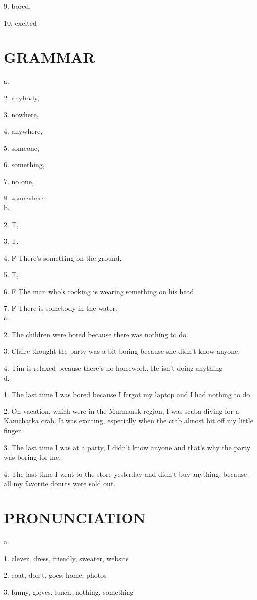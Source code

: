 \documentclass{article}
\begin{document}
9. bored, 

10. excited
\section*{GRAMMAR}


a. 

2. anybody, 

3. nowhere, 

4. anywhere, 

5. someone, 

6. something, 

7. no one, 

8. somewhere
\\
b. 

2. T, 

3. T,


4. F There's something on the ground.


5. T,


6. F The man who's cooking is wearing something on his head


7. F There is somebody in the water. 
\\
c. 

2. The children were bored because there was nothing to do.


3. Claire thought the party was a bit boring because she didn't know anyone.


4. Tim is relaxed because there's no homework. He isn't doing anything
\\
d.

1. The last time I was bored because I forgot my laptop and I had nothing to do.

2. On vacation, which were in the Murmansk region, I was scuba diving for a Kamchatka crab. It was exciting, especially when the crab almost bit off my little finger.

3. The last time I was at a party, I didn't know anyone and that's why the party was boring for me.

4. The last time I went to the store yesterday and didn't buy anything, because all my favorite donuts were sold out.
\section*{PRONUNCIATION}
a.

1. clever, dress, friendly, sweater, website

2. coat, don't, goes, home, photos

3. funny, gloves, lunch, nothing, something
\end{document}
